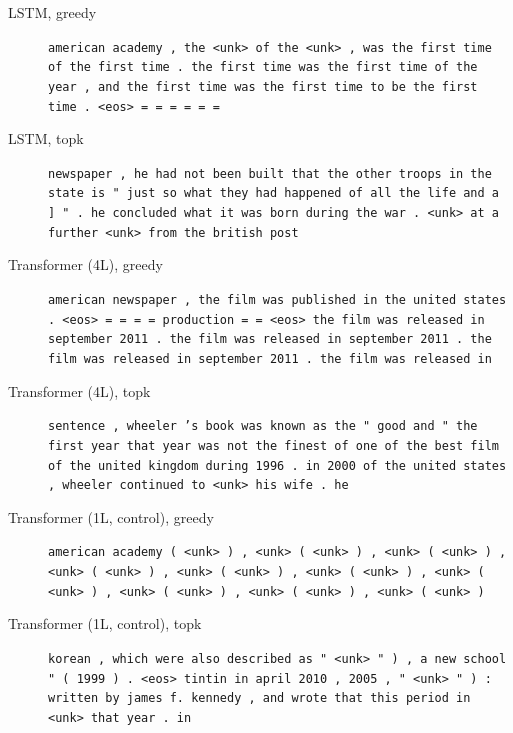 \begin{description}
\item[LSTM, greedy] \texttt{\small american academy , the \textless{}unk\textgreater{} of the \textless{}unk\textgreater{} , was the first time of the first time . the first time was the first time of the year , and the first time was the first time to be the first time . \textless{}eos\textgreater{} = = = = = =}
\item[LSTM, topk] \texttt{\small newspaper , he had not been built that the other troops in the state is " just so what they had happened of all the life and a ] " . he concluded what it was born during the war . \textless{}unk\textgreater{} at a further \textless{}unk\textgreater{} from the british post}
\item[Transformer (4L), greedy] \texttt{\small american newspaper , the film was published in the united states . \textless{}eos\textgreater{} = = = = production = = \textless{}eos\textgreater{} the film was released in september 2011 . the film was released in september 2011 . the film was released in september 2011 . the film was released in}
\item[Transformer (4L), topk] \texttt{\small sentence , wheeler 's book was known as the " good and " the first year that year was not the finest of one of the best film of the united kingdom during 1996 . in 2000 of the united states , wheeler continued to \textless{}unk\textgreater{} his wife . he}
\item[Transformer (1L, control), greedy] \texttt{\small american academy ( \textless{}unk\textgreater{} ) , \textless{}unk\textgreater{} ( \textless{}unk\textgreater{} ) , \textless{}unk\textgreater{} ( \textless{}unk\textgreater{} ) , \textless{}unk\textgreater{} ( \textless{}unk\textgreater{} ) , \textless{}unk\textgreater{} ( \textless{}unk\textgreater{} ) , \textless{}unk\textgreater{} ( \textless{}unk\textgreater{} ) , \textless{}unk\textgreater{} ( \textless{}unk\textgreater{} ) , \textless{}unk\textgreater{} ( \textless{}unk\textgreater{} ) , \textless{}unk\textgreater{} ( \textless{}unk\textgreater{} ) , \textless{}unk\textgreater{} ( \textless{}unk\textgreater{} )}
\item[Transformer (1L, control), topk] \texttt{\small korean , which were also described as " \textless{}unk\textgreater{} " ) , a new school " ( 1999 ) . \textless{}eos\textgreater{} tintin in april 2010 , 2005 , " \textless{}unk\textgreater{} " ) : written by james f. kennedy , and wrote that this period in \textless{}unk\textgreater{} that year . in}
\end{description}
